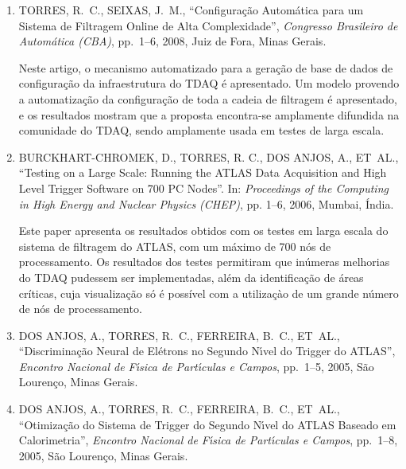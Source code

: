 \begin{enumerate}

\item \MakeUppercase{ Torres, R.~C., Seixas, J.~M.}, \enquote{Configura{\c c}{\~a}o
  Autom{\'a}tica para um Sistema de Filtragem Online de Alta Complexidade},
  {\em Congresso Brasileiro de Autom{\'a}tica ({CBA})\/}, pp.~1--6, 2008, Juiz de Fora, Minas Gerais.

Neste artigo, o mecanismo automatizado para a geração de base de dados de configuração da infraestrutura do TDAQ é  apresentado. Um modelo provendo a automatização da configuração de toda a cadeia de filtragem é apresentado, e os resultados mostram que a proposta encontra-se amplamente difundida na comunidade do TDAQ, sendo amplamente usada em testes de larga escala.

\item \MakeUppercase{ Burckhart-Chromek, D., Torres, R. C., {dos Anjos}, A.,
  \MakeLowercase{et~al.}}, \enquote{Testing on a Large Scale: Running the
  {ATLAS} Data Acquisition and High Level Trigger Software on 700 {PC} Nodes}.
\newblock In: {\em Proceedings of the Computing in High Energy and Nuclear
  Physics (CHEP)\/}, pp. 1--6, 2006, Mumbai, Índia.
  
  Este paper apresenta os resultados obtidos com os testes em larga escala do sistema de filtragem do ATLAS, com um máximo de 700 nós de processamento. Os resultados dos testes permitiram que inúmeras melhorias do TDAQ pudessem ser implementadas, além da identificação de áreas críticas, cuja visualização só é possível com a utilizaçào de um grande número de nós de processamento. 

\item \MakeUppercase{ {dos Anjos}, A., Torres, R.~C., Ferreira, B.~C.,
  \MakeLowercase{et~al.}}, \enquote{Discrimina{\c c}{\~a}o Neural de
  El{\'e}trons no Segundo N{\'\i}vel do Trigger do ATLAS}, {\em Encontro
  Nacional de F{\'\i}sica de Part{\'\i}culas e Campos\/}, pp.~1--5, 2005, São Lourenço, Minas Gerais.

\item \MakeUppercase{ {dos Anjos}, A., Torres, R.~C., Ferreira, B.~C.,
  \MakeLowercase{et~al.}}, \enquote{Otimiza{\c c}{\~a}o do Sistema de Trigger
  do Segundo N{\'\i}vel do {ATLAS} Baseado em Calorimetria}, {\em Encontro
  Nacional de F{\'\i}sica de Part{\'\i}culas e Campos\/}, pp.~1--8, 2005, São Lourenço, Minas Gerais.

\end{enumerate}


